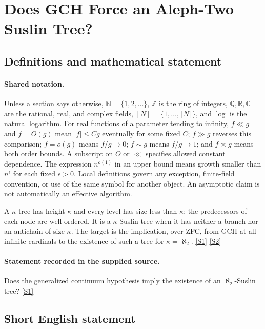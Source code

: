 \documentclass[11pt,a4paper]{article}
\newcommand{\N}{\mathbb{N}}
\newcommand{\Z}{\mathbb{Z}}
\newcommand{\Q}{\mathbb{Q}}
\newcommand{\R}{\mathbb{R}}
\newcommand{\C}{\mathbb{C}}
\newcommand{\sref}[2]{\hyperlink{source:#1:#2}{[S#2]}}
\begin{document}
\section{Does GCH Force an Aleph-Two Suslin Tree?}\label{statement}


\subsection{Definitions and mathematical statement}

\paragraph{Shared notation.}Unless a section says otherwise, $\N=\{1,2,\ldots\}$,
$\Z$ is the ring of integers, $\Q,\R,\C$ are the rational, real, and complex
fields, $[N]=\{1,\ldots,\lfloor N\rfloor\}$, and $\log$ is the natural
logarithm. For real functions of a parameter tending to infinity,
$f\ll g$ and $f=O(g)$ mean $|f|\leq Cg$ eventually for some fixed $C$;
$f\gg g$ reverses this comparison; $f=o(g)$ means $f/g\to0$;
$f\sim g$ means $f/g\to1$; and $f\asymp g$ means both order bounds.
A subscript on $O$ or $\ll$ specifies allowed constant dependence.
The expression $n^{o(1)}$ in an upper bound means growth smaller than
$n^\epsilon$ for each fixed $\epsilon>0$. Local definitions govern any
exception, finite-field convention, or use of the same symbol for another
object. An asymptotic claim is not automatically an effective algorithm.



A $\kappa$-tree has height $\kappa$ and every level has size less than $\kappa$; the predecessors of each node are well-ordered. It is a $\kappa$-Suslin tree when it has neither a branch nor an antichain of size $\kappa$. The target is the implication, over ZFC, from GCH at all infinite cardinals to the existence of such a tree for $\kappa=\aleph_2$. \sref{statement}{1} \sref{statement}{2}

\paragraph{Statement recorded in the supplied source.}
Does the generalized continuum hypothesis imply the existence of an $\aleph_2$-Suslin tree? \sref{statement}{1}

\subsection{Short English statement}
\end{document}
